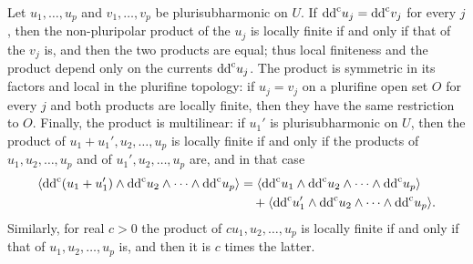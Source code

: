 \begin{proposition}\label{prop:nonpluripolar-local-calculus}
Let $u_1,\ldots,u_p$ and $v_1,\ldots,v_p$ be plurisubharmonic on $U$. If $\mathrm{dd}^{\mathrm{c}} u_j=\mathrm{dd}^{\mathrm{c}} v_j$ for every $j$, then the non-pluripolar product of the $u_j$ is locally finite if and only if that of the $v_j$ is, and then the two products are equal; thus local finiteness and the product depend only on the currents $\mathrm{dd}^{\mathrm{c}} u_j$. The product is symmetric in its factors and local in the plurifine topology: if $u_j=v_j$ on a plurifine open set $O$ for every $j$ and both products are locally finite, then they have the same restriction to $O$. Finally, the product is multilinear: if $u_1'$ is plurisubharmonic on $U$, then the product of $u_1+u_1',u_2,\ldots,u_p$ is locally finite if and only if the products of $u_1,u_2,\ldots,u_p$ and of $u_1',u_2,\ldots,u_p$ are, and in that case
\[
 \begin{aligned}
 \langle\mathrm{dd}^{\mathrm{c}}(u_1+u_1')\wedge\mathrm{dd}^{\mathrm{c}} u_2\wedge\cdots\wedge\mathrm{dd}^{\mathrm{c}} u_p\rangle
 &=\langle\mathrm{dd}^{\mathrm{c}} u_1\wedge\mathrm{dd}^{\mathrm{c}} u_2\wedge\cdots\wedge\mathrm{dd}^{\mathrm{c}} u_p\rangle\\
 &\quad+\langle\mathrm{dd}^{\mathrm{c}} u_1'\wedge\mathrm{dd}^{\mathrm{c}} u_2\wedge\cdots\wedge\mathrm{dd}^{\mathrm{c}} u_p\rangle.
 \end{aligned}
\]
Similarly, for real $c>0$ the product of $cu_1,u_2,\ldots,u_p$ is locally finite if and only if that of $u_1,u_2,\ldots,u_p$ is, and then it is $c$ times the latter.
\end{proposition}
